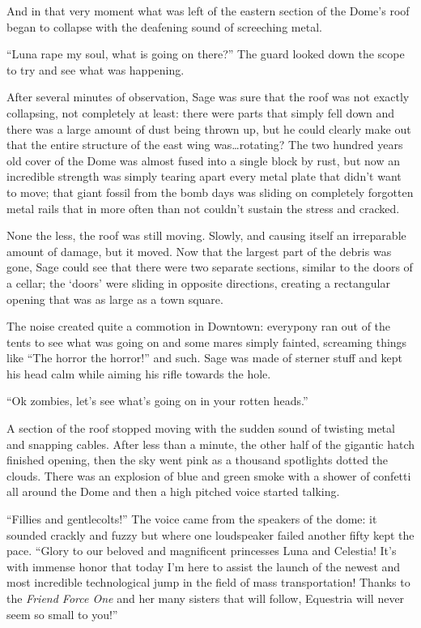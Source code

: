 And in that very moment what was left of the eastern section of the Dome's roof began to collapse with the deafening sound of screeching metal.

``Luna rape my soul, what is going on there?'' The guard looked down the scope to try and see what was happening.

After several minutes of observation, Sage was sure that the roof was not exactly collapsing, not completely at least: there were parts that simply fell down and there was a large amount of dust being thrown up, but he could clearly make out that the entire structure of the east wing was\dots rotating? The two hundred years old cover of the Dome was almost fused into a single block by rust, but now an incredible strength was simply tearing apart every metal plate that didn't want to move; that giant fossil from the bomb days was sliding on completely forgotten metal rails that in more often than not couldn't sustain the stress and cracked.

None the less, the roof was still moving. Slowly, and causing itself an irreparable amount of damage, but it moved. Now that the largest part of the debris was gone, Sage could see that there were two separate sections, similar to the doors of a cellar; the `doors' were sliding in opposite directions, creating a rectangular opening that was as large as a town square.

The noise created quite a commotion in Downtown: everypony ran out of the tents to see what was going on and some mares simply fainted, screaming things like ``The horror the horror!'' and such. Sage was made of sterner stuff and kept his head calm while aiming his rifle towards the hole.

``Ok zombies, let's see what's going on in your rotten heads.''

A section of the roof stopped moving with the sudden sound of twisting metal and snapping cables. After less than a minute, the other half of the gigantic hatch finished opening, then the sky went pink as a thousand spotlights dotted the clouds. There was an explosion of blue and green smoke with a shower of confetti all around the Dome and then a high pitched voice started talking.

``Fillies and gentlecolts!'' The voice came from the speakers of the dome: it sounded crackly and fuzzy but where one loudspeaker failed another fifty kept the pace. ``Glory to our beloved and magnificent princesses Luna and Celestia! It's with immense honor that today I'm here to assist the launch of the newest and most incredible technological jump in the field of mass transportation! Thanks to the \emph{Friend Force One} and her many sisters that will follow, Equestria will never seem so small to you!''


